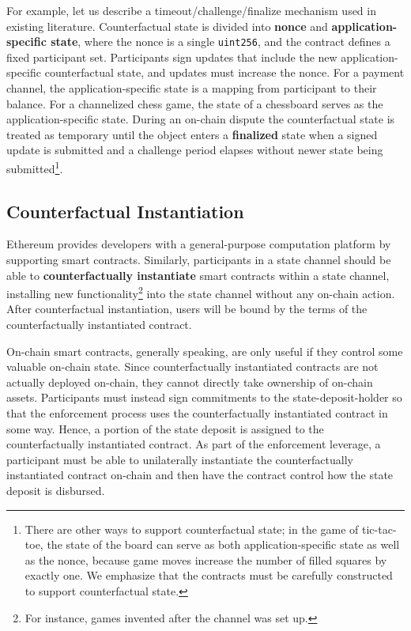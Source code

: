 \documentclass[prb,floatfix,reprint,nofootinbib,amsmath,amssymb,epsfig,pre,floats,letterpaper,groupedaffiliation,tightenlines,allcolors=blue,11pt]{revtex4}
\theoremstyle{definition}
\theoremstyle{definition}
\theoremstyle{definition}
\begin{document}
For example, let us describe a timeout/challenge/finalize mechanism used in existing literature. Counterfactual state is divided into \textbf{nonce} and \textbf{application-specific state}, where the nonce is a single \texttt{uint256}, and the contract defines a fixed participant set. Participants sign updates that include the new application-specific counterfactual state, and updates must increase the nonce. For a payment channel, the application-specific state is a mapping from participant to their balance. For a channelized chess game, the state of a chessboard serves as the application-specific state. During an on-chain dispute the counterfactual state is treated as temporary until the object enters a \textbf{finalized} state when a signed update is submitted and a challenge period elapses without newer state being submitted\footnote{There are other ways to support counterfactual state; in the game of tic-tac-toe, the state of the board can serve as both application-specific state as well as the nonce, because game moves increase the number of filled squares by exactly one. We emphasize that the contracts must be carefully constructed to support counterfactual state.}.

\subsection{Counterfactual Instantiation}

Ethereum provides developers with a general-purpose computation platform by supporting smart contracts. Similarly, participants in a state channel should be able to \textbf{counterfactually instantiate} smart contracts within a state channel, installing new functionality\footnote{For instance, games invented after the channel was set up.} into the state channel without any on-chain action. After counterfactual instantiation, users will be bound by the terms of the counterfactually instantiated contract.

On-chain smart contracts, generally speaking, are only useful if they control some valuable on-chain state. Since counterfactually instantiated contracts are not actually deployed on-chain, they cannot directly take ownership of on-chain assets. Participants must instead sign commitments to the state-deposit-holder so that the enforcement process uses the counterfactually instantiated contract in some way. Hence, a portion of the state deposit is assigned to the counterfactually instantiated contract. As part of the enforcement leverage, a participant must be able to unilaterally instantiate the counterfactually instantiated contract on-chain and then have the contract control how the state deposit is disbursed.
\end{document}
